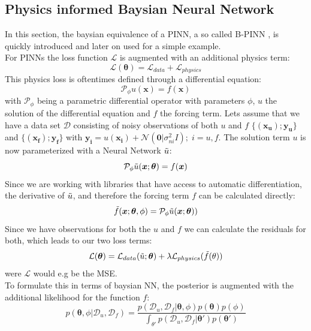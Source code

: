 \documentclass{article}
\begin{document}
\subsection{Physics informed Baysian Neural Network}
In this section, the baysian equivalence of a PINN, a so called B-PINN \cite{Yang_2021}, is quickly introduced and later on used for a simple example. \\
For PINNs the loss function $\mathcal{L}$ is augmented with an additional physics term:
\begin{equation}
    \mathcal{L}(\bm \theta) = \mathcal{L}_{data} + \mathcal{L}_{physics}
\end{equation}
This physics loss is oftentimes defined through a differential equation:
\begin{equation}
    \mathcal{P}_\phi u(\bm x) = f(\bm x)
\end{equation}
with $\mathcal{P}_\phi$ being a parametric differential operator with parameters $\phi$, $u$ the solution of the differential equation and $f$ the forcing term. Lets assume that we have a data set $\mathcal{D}$ consisting of noisy observations of both $u$ and $f$ $\{(\bm{x_u});\bm{y_u}\}$ and $\{(\bm{x_f});\bm{y_f}\}$ with $\bm{y_i} = u(\bm{x_i}) + \mathcal{N}(\bm{0}|\sigma_{ni}^2 I) ; \; i = u,f$. The solution term $u$ is now parameterized with a Neural Network $\Tilde{u}$:
\begin{equation}
    \mathcal{P}_\phi \Tilde{u}(\bm x; \bm \theta) = f(\bm x)
\end{equation}
Since we are working with libraries that have access to automatic differentiation, the derivative of $\Tilde{u}$, and therefore the forcing term $f$ can be calculated directly:
\begin{equation}
    \Tilde{f}(\bm x;\bm \theta, \phi) = \mathcal{P}_\phi \Tilde{u}(\bm x; \bm \theta))
\end{equation}
Since we have observations for both the $u$ and $f$ we can calculate the residuals for both, which leads to our two loss terms:
\begin{equation}
    \mathcal{L}(\bm \theta) = \mathcal{L}_{data}(\Tilde{u}; \bm \theta) + \lambda \mathcal{L}_{physics}(\Tilde{f}(\theta))
\end{equation}
were $\mathcal{L}$ would e.g be the MSE.\\
To formulate this in terms of baysian NN, the posterior is augmented with the additional likelihood for the function $f$:
\begin{equation} \label{eq:post_params_BPINN}
    p(\bm \theta, \phi|\mathcal{D}_u, \mathcal{D}_f) = \frac{p(\mathcal{D}_u, \mathcal{D}_f|\bm \theta, \phi)p(\bm \theta)p(\phi)}{\int_{\theta'}p(\mathcal{D}_u, \mathcal{D}_f|\bm \theta')p(\bm \theta')}
\end{equation}
\end{document}
